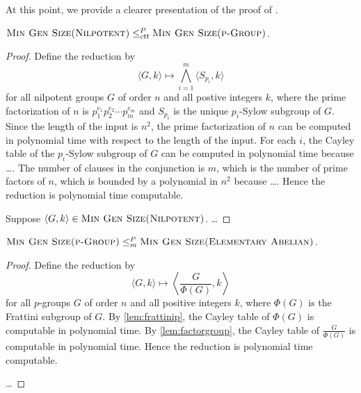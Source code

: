 \documentclass{article}
\begin{document}
At this point, we provide a clearer presentation of the proof of \cite[Theorem~7]{at06}.

\begin{proposition}
  $\textsc{Min Gen Size(Nilpotent)} \leq_{ctt}^P \textsc{Min Gen Size(p-Group)}$.
\end{proposition}
\begin{proof}
  Define the reduction by
  \begin{equation*}
    \langle G, k \rangle \mapsto \bigwedge_{i=1}^m \langle S_{p_i}, k \rangle
  \end{equation*}
  for all nilpotent groups $G$ of order $n$ and all postive integers $k$, where the prime factorization of $n$ is $p_1^{e_1}p_2^{e_2}\dotsb p_m^{e_m}$ and $S_{p_i}$ is the unique $p_i$-Sylow subgroup of $G$.
  Since the length of the input is $n^2$, the prime factorization of $n$ can be computed in polynomial time with respect to the length of the input.
  For each $i$, the Cayley table of the $p_i$-Sylow subgroup of $G$ can be computed in polynomial time because \ldots.
  The number of clauses in the conjunction is $m$, which is the number of prime factors of $n$, which is bounded by a polynomial in $n^2$ because \ldots.
  Hence the reduction is polynomial time computable.

  Suppose $\langle G, k \rangle \in \textsc{Min Gen Size(Nilpotent)}$.
  \ldots
\end{proof}

\begin{proposition}
  $\textsc{Min Gen Size(p-Group)} \leq_m^P \textsc{Min Gen Size(Elementary Abelian)}$.
\end{proposition}
\begin{proof}
  Define the reduction by
  \begin{equation*}
    \langle G, k \rangle \mapsto \left\langle \frac{G}{\Phi(G)}, k \right\rangle
  \end{equation*}
  for all $p$-groups $G$ of order $n$ and all positive integers $k$, where $\Phi(G)$ is the Frattini subgroup of $G$.
  By \autoref{lem:frattinip}, the Cayley table of $\Phi(G)$ is computable in polynomial time.
  By \autoref{lem:factorgroup}, the Cayley table of $\frac{G}{\Phi(G)}$ is computable in polynomial time.
  Hence the reduction is polynomial time computable.

  \ldots
\end{proof}
\end{document}
